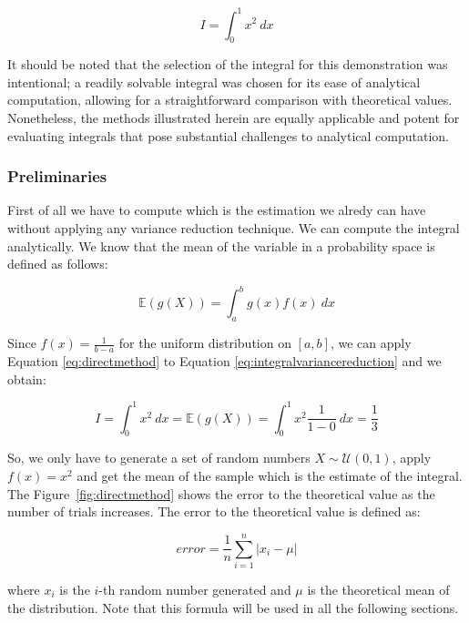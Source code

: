 \documentclass{article}
\begin{document}
\begin{equation} \label{eq:integralvariancereduction} I = \int_{0}^{1} x^2 \ dx \end{equation}

It should be noted that the selection of the integral for this demonstration was intentional; a readily solvable integral was chosen for its ease of analytical computation, allowing for a straightforward comparison with theoretical values. Nonetheless, the methods illustrated herein are equally applicable and potent for evaluating integrals that pose substantial challenges to analytical computation.

\subsubsection{Preliminaries}
\label{sec:variance_reduction_preliminaries}

First of all we have to compute which is the estimation we alredy can have without applying any variance reduction technique. We can compute the integral analytically. We know that the mean of the variable in a probability space is defined as follows:

\begin{equation} 
	\label{eq:directmethod} 
	\mathbb{E}(g(X)) = \int_a^b g(x)f(x) \ dx
\end{equation}

Since \(f(x) = \frac{1}{b-a}\) for the uniform distribution on \([a,b]\), we can apply Equation \eqref{eq:directmethod} to Equation \eqref{eq:integralvariancereduction} and we obtain:

\begin{equation} \label{eq:directmethodintegral} I = \int_{0}^{1} x^2 \ dx = \mathbb{E}(g(X)) = \int_0^1 x^2 \frac{1}{1-0} \ dx = \frac{1}{3} \end{equation}

So, we only have to generate a set of random numbers \(X \sim \mathcal{U}(0,1)\), apply \(f(x) = x^2\) and get the mean of the sample which is the estimate of the integral. The Figure~\ref{fig:directmethod} shows the error to the theoretical value as the number of trials increases. The error to the theoretical value is defined as:

\begin{equation*} error = \frac{1}{n}\sum_{i=1}^{n} | x_i - \mu | \end{equation*}

where \(x_i\) is the \(i\)-th random number generated and \(\mu\) is the theoretical mean of the distribution. Note that this formula will be used in all the following sections.
\end{document}
